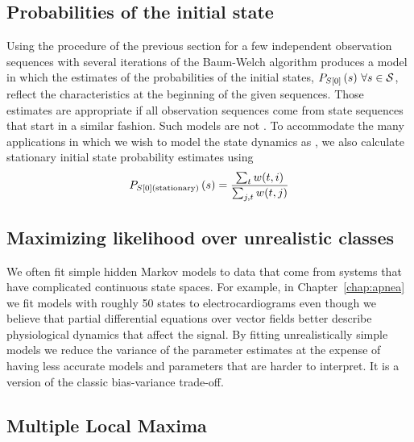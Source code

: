 \subsection{Probabilities of the initial state}
\label{sec:Ps0}

Using the procedure of the previous section for a few independent
observation sequences with several iterations of the Baum-Welch
algorithm produces a model in which the estimates of the probabilities
of the initial states, $P_{\ti{S}{0}} \left(s \right)\,\forall s \in
\states$, reflect the characteristics at the beginning of the given
sequences.  Those estimates are appropriate if all observation
sequences come from state sequences that start in a similar fashion.
Such models are not .  To accommodate the many
applications in which we wish to model the state dynamics as
, we also calculate stationary initial state probability
estimates using
\begin{equation}
  \label{eq:Ps0stationary}
  P_{{S}{[0]}(\text{stationary})} \left(s \right) =
  \frac{\sum_{t}w(t,i)}{\sum_{j,t}w(t,j)}
\end{equation}



\subsection{Maximizing likelihood over unrealistic classes}
\label{sec:incredible}

We often fit simple hidden Markov models to data that come from
systems that have complicated continuous state spaces.  For example,
in Chapter~\ref{chap:apnea} we fit models with roughly 50 states to
electrocardiograms even though we believe that partial differential
equations over vector fields better describe physiological dynamics
that affect the signal.  By fitting unrealistically simple models we
reduce the variance of the parameter estimates at the expense of
having less accurate models and parameters that are harder to
interpret.  It is a version of the classic  bias-variance trade-off.

\subsection{Multiple Local Maxima}
\label{sec:MultiMax}

